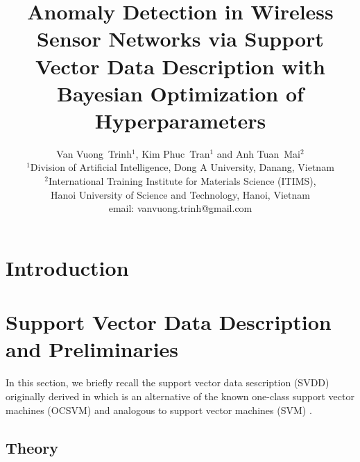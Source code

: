 \documentclass[journal,transmag,times]{IEEEtran}
\begin{document}
\title{Anomaly Detection in Wireless Sensor Networks via Support Vector Data Description with Bayesian Optimization of Hyperparameters}

\author{
Van Vuong~Trinh$^1$,
Kim Phuc~Tran$^1$ and 
Anh Tuan~Mai$^2$\\
$^1$Division of Artificial Intelligence, Dong A University, Danang, Vietnam\\
$^2$International Training Institute for Materials Science (ITIMS),\\Hanoi University of Science and Technology, Hanoi, Vietnam\\
email: vanvuong.trinh@gmail.com
}


\maketitle

\section{Introduction}

\section{Support Vector Data Description and Preliminaries}

In this section, we briefly recall the support vector data sescription (SVDD) originally derived in \cite{Tax2004} which is an alternative of the known one-class support vector machines (OCSVM) \cite{Scholkopf2000} and analogous to support vector machines (SVM) \cite{Vapnik1998}.

\subsection{Theory}
\end{document}
